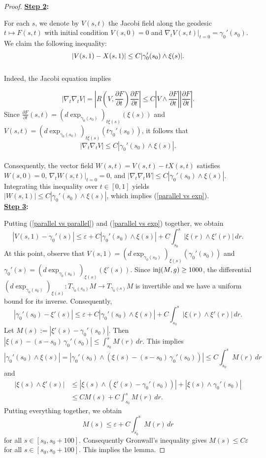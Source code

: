 \documentclass[a4paper, reqno]{amsart}
\theoremstyle{definition}
\theoremstyle{remark}
\numberwithin{equation}{section}
\newcommand{\inj}{\textup{inj}}
\numberwithin{equation}{section}
\numberwithin{equation}{section}
\begin{document}
\begin{proof}
 \textbf{\underline{Step 2}:} \
  
For each $s$, we denote by $V(s,t)$ the Jacobi field along the geodesic $t \mapsto F(s,t)$ with initial condition $V(s,0) = 0$ and $\nabla_t V(s,t) |_{t=0} = \gamma_0'(s_0)$. We claim the following inequality:
\begin{equation}{\label{parallel vs exp}}
	|V(s,1) - X(s,1)| \leq C |\gamma_0'(s_0) \wedge \xi(s)|.
\end{equation}\\
Indeed, the Jacobi equation implies

\[|\nabla_t\nabla_t V| = \left|R\left(V, \frac{\partial F}{\partial t}\right)\frac{\partial F}{\partial t}\right|\leq C\left|V\wedge \frac{\partial F}{\partial t}\right|\left|\frac{\partial F}{\partial t}\right|.\]
Since  $\frac{\partial F}{\partial t}(s,t) =  (d\exp_{\gamma_0(s_0)})_{t\xi(s)}(\xi(s))$ and $V(s,t) = (d\exp_{\gamma_0(s_0)})_{t\xi(s)}(t\gamma_0'(s_0))$, it follows that
\[|\nabla_t\nabla_t V|\leq C|\gamma_0'(s_0)\wedge \xi(s)|.\]\\
Consequently, the vector field $W(s,t) = V(s,t) - tX(s,t)$ satisfies $W(s,0) = 0$, $\nabla_t W(s,t)|_{t=0} = 0$, and $|\nabla_t \nabla_t W| \leq C|\gamma_0'(s_0)\wedge \xi(s)|$. Integrating this inequality over $t\in [0,1]$ yields $|W(s,1)| \leq C|\gamma_0'(s_0)\wedge \xi(s)|$, which implies (\ref{parallel vs exp}).\\



 \textbf{\underline{Step 3}:} \


Putting (\ref{parallel vs parallel}) and (\ref{parallel vs exp}) together, we obtain 
\[|V(s,1) - \gamma_0'(s)| \leq \varepsilon + C |\gamma_0'(s_0) \wedge \xi(s)| + C \int_{s_0}^s |\xi(r) \wedge \xi'(r)| \, dr.\] 
At this point, observe that $V(s,1) = (d\exp_{\gamma_0(s_0)})_{\xi(s)}(\gamma_0'(s_0))$ and $\gamma_0'(s) = (d\exp_{\gamma_0(s_0)})_{\xi(s)}(\xi'(s))$. Since $\inj(M,g)\geq 1000$, the differential $(d\exp_{\gamma_0(s_0)})_{\xi(s)}: T_{\gamma_0(s_0)} M \to T_{\gamma_0(s)} M$ is invertible and we have a uniform bound for its inverse. Consequently, 
\[|\gamma_0'(s_0) - \xi'(s)| \leq \varepsilon + C |\gamma_0'(s_0) \wedge \xi(s)| + C \int_{s_0}^s |\xi(r) \wedge \xi'(r)| \, dr.\] 
Let $M(s) := |\xi'(s) - \gamma_0'(s_0)|$. Then $|\xi(s) - (s-s_0) \, \gamma_0'(s_0)| \leq \int_{s_0}^s M(r) \, dr$. This implies 
\[|\gamma_0'(s_0) \wedge \xi(s)| = |\gamma_0'(s_0) \wedge (\xi(s) - (s-s_0) \, \gamma_0'(s_0))| \leq C \int_{s_0}^s M(r) \, dr\] 
and 
\begin{align*} 
|\xi(s) \wedge \xi'(s)| 
&\leq |\xi(s) \wedge (\xi'(s) - \gamma_0'(s_0))| + |\xi(s) \wedge \gamma_0'(s_0)| \\ 
&\leq C M(s) + C \int_{s_0}^s M(r) \, dr. 
\end{align*}
Putting everything together, we obtain 
\[M(s) \leq \varepsilon + C \int_{s_0}^s M(r) \, dr\] 
for all $s \in [s_0,s_0+100]$. Consequently Gronwall's inequality gives $M(s) \leq C\varepsilon$ for all $s \in [s_0,s_0+100]$. This implies the lemma.

\end{proof}\
\end{document}
